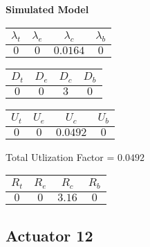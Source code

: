 \documentclass{article}
\begin{document}
\begin{minipage}{0.5\textwidth}
\centering	\textbf{Simulated Model}
\begin{table}[H]
\centering
\begin{tabular}{@{}cccc@{}}
\toprule
$\lambda_t$ & $\lambda_e$ & $\lambda_c$ & $\lambda_b$\\
\midrule
$0$ & $0$ & $0.0164$ & $0$\\
\bottomrule
\end{tabular}
\end{table}
\begin{table}[H]
\centering
\begin{tabular}{@{}cccc@{}}
\toprule
$D_t$ & $D_e$ & $D_c$ & $D_b$\\
\midrule
$0$ & $0$ & $3$ & $0$\\
\bottomrule
\end{tabular}
\end{table}\begin{table}[H]
\centering
\begin{tabular}{@{}cccc@{}}
\toprule
$U_t$ & $U_e$ & $U_c$ & $U_b$\\
\midrule
$0$ & $0$ & $0.0492$ & $0$\\
\bottomrule
\end{tabular}
\end{table}
\centering Total Utlization Factor = $0.0492$
\begin{table}[H]
\centering
\begin{tabular}{@{}cccc@{}}
\toprule
$R_t$ & $R_e$ & $R_c$ & $R_b$\\
\midrule
$0$ & $0$ & $3.16$ & $0$\\
\bottomrule
\end{tabular}
\end{table}
\end{minipage}\subsection{Actuator 12}
\end{document}
